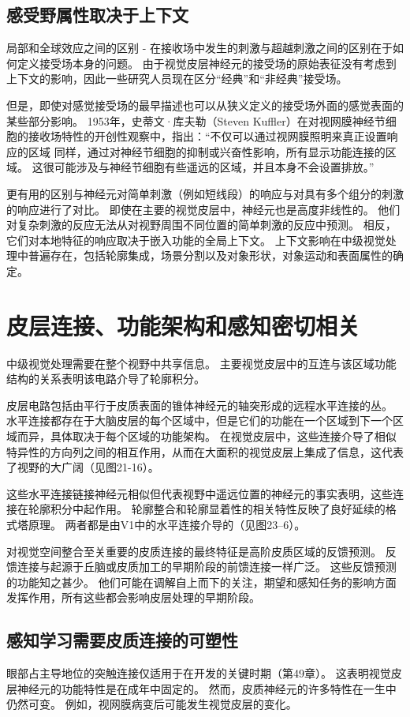\subsection{感受野属性取决于上下文}

局部和全球效应之间的区别 - 在接收场中发生的刺激与超越刺激之间的区别在于如何定义接受场本身的问题。 由于视觉皮层神经元的接受场的原始表征没有考虑到上下文的影响，因此一些研究人员现在区分“经典”和“非经典”接受场。

但是，即使对感觉接受场的最早描述也可以从狭义定义的接受场外面的感觉表面的某些部分影响。 1953年，史蒂文·库夫勒（Steven Kuffler）在对视网膜神经节细胞的接收场特性的开创性观察中，指出：“不仅可以通过视网膜照明来真正设置响应的区域 同样，通过对神经节细胞的抑制或兴奋性影响，所有显示功能连接的区域。 这很可能涉及与神经节细胞有些遥远的区域，并且本身不会设置排放。”

更有用的区别与神经元对简单刺激（例如短线段）的响应与对具有多个组分的刺激的响应进行了对比。 即使在主要的视觉皮层中，神经元也是高度非线性的。 他们对复杂刺激的反应无法从对视野周围不同位置的简单刺激的反应中预测。 相反，它们对本地特征的响应取决于嵌入功能的全局上下文。 上下文影响在中级视觉处理中普遍存在，包括轮廓集成，场景分割以及对象形状，对象运动和表面属性的确定。


\section{皮层连接、功能架构和感知密切相关}
中级视觉处理需要在整个视野中共享信息。 主要视觉皮层中的互连与该区域功能结构的关系表明该电路介导了轮廓积分。

皮层电路包括由平行于皮质表面的锥体神经元的轴突形成的远程水平连接的丛。 水平连接都存在于大脑皮层的每个区域中，但是它们的功能在一个区域到下一个区域而异，具体取决于每个区域的功能架构。 在视觉皮层中，这些连接介导了相似特异性的方向列之间的相互作用，从而在大面积的视觉皮层上集成了信息，这代表了视野的大广阔（见图21-16）。

这些水平连接链接神经元相似但代表视野中遥远位置的神经元的事实表明，这些连接在轮廓积分中起作用。 轮廓整合和轮廓显着性的相关特性反映了良好延续的格式塔原理。 两者都是由V1中的水平连接介导的（见图23–6）。

对视觉空间整合至关重要的皮质连接的最终特征是高阶皮质区域的反馈预测。 反馈连接与起源于丘脑或皮质加工的早期阶段的前馈连接一样广泛。 这些反馈预测的功能知之甚少。 他们可能在调解自上而下的关注，期望和感知任务的影响方面发挥作用，所有这些都会影响皮层处理的早期阶段。

\subsection{感知学习需要皮质连接的可塑性}
眼部占主导地位的突触连接仅适用于在开发的关键时期（第49章）。 这表明视觉皮层神经元的功能特性是在成年中固定的。 然而，皮质神经元的许多特性在一生中仍然可变。 例如，视网膜病变后可能发生视觉皮层的变化。


